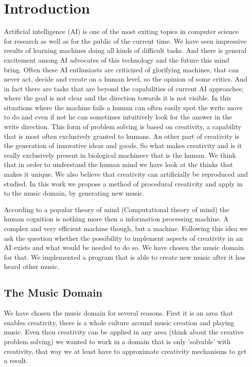 \section{Introduction} 
Artificial intelligence (AI) is one of the most exiting topics in computer science for research as well as for the public of the current time. We have seen impressive results of learning machines doing all kinds of difficult tasks. And there is general excitement among AI advocates of this technology and the future this mind bring. Often these AI enthusiasts are criticized of glorifying machines, that can never act, decide and create on a human level, so the opinion of some critics. And in fact there are tasks that are beyond the capabilities of current AI approaches; where the goal is not clear and the direction towards it is not visible. In this situations where the machine fails a human can often easily spot the write move to do and even if not he can sometimes intuitively look for the answer in the write direction. This form of problem solving is based on creativity, a capability that is most often exclusively granted to humans. An other part of creativity is the generation of innovative ideas and goods. So what makes creativity and is it really exclusively present in biological machinesv that is the human. We think that in order to understand the human mind we have look at the thinks that makes it unique. We also believe that creativity can artificially be reproduced and studied. In this work we propose a method of procedural creativity and apply in to the music domain, by generating new music.

According to a popular theory of mind (Computational theory of mind) 
the human cognition is nothing more then a information processing machine. A complex and very efficient machine though, but a machine. Following this idea we ask the question whether the possibility to implement aspects of creativity in an AI exists and what would be needed to do so. We have chosen the music domain for that. We implemented a program that is able to create new music after it has heard other music.

\subsection{The Music Domain}
We have chosen the music domain for several reasons. First it is an area that enables creativity, there is a whole culture around music creation and playing music. Even thou creativity can be applied in any area (think about the creative problem solving) we wanted to work in a domain that is only 'solvable' with creativity, that way we at least have to approximate creativity mechanisms to get a result.

